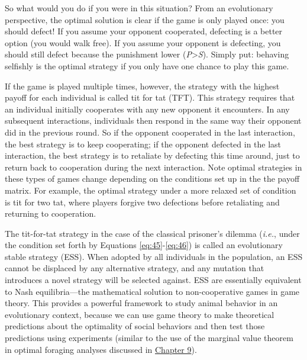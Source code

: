 \documentclass[
]{book}
\begin{document}
So what would you do if you were in this situation? From an evolutionary perspective, the optimal solution is clear if the game is only played once: you should defect! If you assume your opponent cooperated, defecting is a better option (you would walk free). If you assume your opponent is defecting, you should still defect because the punishment lower (\emph{P}\textgreater{}\emph{S}). Simply put: behaving selfishly is the optimal strategy if you only have one chance to play this game.

If the game is played multiple times, however, the strategy with the highest payoff for each individual is called tit for tat (TFT). This strategy requires that an individual initially cooperates with any new opponent it encounters. In any subsequent interactions, individuals then respond in the same way their opponent did in the previous round. So if the opponent cooperated in the last interaction, the best strategy is to keep cooperating; if the opponent defected in the last interaction, the best strategy is to retaliate by defecting this time around, just to return back to cooperation during the next interaction. Note optimal strategies in these types of games change depending on the conditions set up in the the payoff matrix. For example, the optimal strategy under a more relaxed set of condition is tit for two tat, where players forgive two defections before retaliating and returning to cooperation.

The tit-for-tat strategy in the case of the classical prisoner's dilemma (\emph{i.e.}, under the condition set forth by Equations \eqref{eq:45}-\eqref{eq:46}) is called an evolutionary stable strategy (ESS). When adopted by all individuals in the population, an ESS cannot be displaced by any alternative strategy, and any mutation that introduces a novel strategy will be selected against. ESS are essentially equivalent to Nash equilibria---the mathematical solution to non-cooperative games in game theory. This provides a powerful framework to study animal behavior in an evolutionary context, because we can use game theory to make theoretical predictions about the optimality of social behaviors and then test those predictions using experiments (similar to the use of the marginal value theorem in optimal foraging analyses discussed in \href{adaptation-and-phenotypic-plasticity.html\#fig:optfor1}{Chapter 9}).
\end{document}
